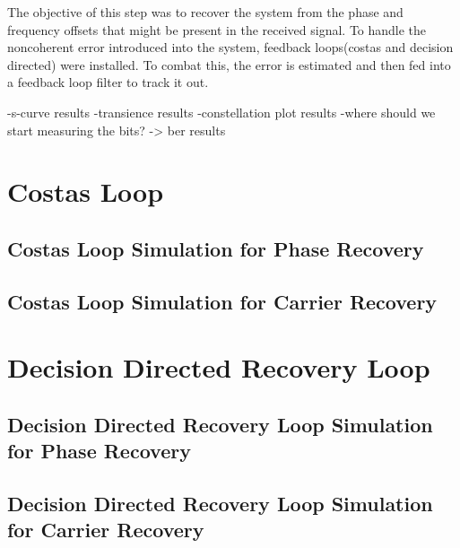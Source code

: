 \documentclass[]{article}
\begin{document}
The objective of this step was to recover the system from the phase and frequency offsets that might be present in the received signal.  To handle the noncoherent error introduced into the system, feedback loops(costas and decision directed) were installed. To combat this, the error is estimated and then fed into a feedback loop filter to track it out. 

-s-curve results
-transience results
-constellation plot results
-where should we start measuring the bits? -> ber results

\appendix
\newpage


\newpage
%

\section{Costas Loop}
\subsection{Costas Loop Simulation for Phase Recovery}


\subsection{Costas Loop Simulation for Carrier Recovery}


\section{Decision Directed Recovery Loop}
\subsection{Decision Directed Recovery Loop Simulation for Phase Recovery}


\subsection{Decision Directed Recovery Loop Simulation for Carrier Recovery}

\end{document}
